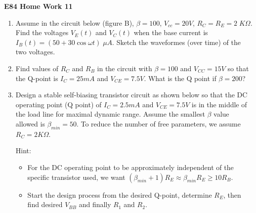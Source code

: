 \usepackage{html}

\begin{center}
{\Large \bf  E84 Home Work 11}
\end{center}
\begin{enumerate}

\item Assume in the circuit below (figure B), $\beta=100$, $V_{cc}=20V$, 
$R_C=R_E=2\;K\Omega$.  Find the voltages $V_E(t)$ and $V_C(t)$ when 
the base current is $I_B(t)=(50+30 \cos \omega t)\;\mu A$. Sketch the
waveformes (over time) of the two voltages.



\item Find values of $R_C$ and $R_B$ in the circuit with $\beta=100$
and $V_{CC}=15V$ so that the Q-point is $I_C=25mA$ and $V_{CE}=7.5V$.
What is the Q point if $\beta=200$?



%  

\item Design a stable self-biasing transistor circuit as shown below
so that the DC operating point (Q point) of $I_C=2.5mA$ and $V_{CE}=7.5V$ 
is in the middle of the load line for maximal dynamic range. Assume 
the smallest $\beta$ value allowed is $\beta_{min}=50$. To reduce the 
number of free parameters, we assume $R_C=2K\Omega$. 

Hint: 
\begin{itemize}
\item For the DC operating point to be approximately independent of the
  specific transistor used, we want $(\beta_{min}+1)R_E\approx 
  \beta_{min} R_E \ge 10 R_B$.
\item Start the design process from the desired Q-point, determine $R_E$, 
then find desired $V_{BB}$ and finally $R_1$ and $R_2$.
\end{itemize}


\end{enumerate}

